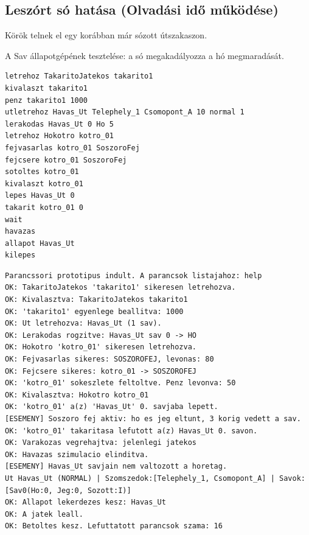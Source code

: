 \subsection{Leszórt só hatása (Olvadási idő működése)}
\begin{test-case-description}
    Körök telnek el egy korábban már sózott útszakaszon.
\end{test-case-description}
\begin{test-case-function}
    A Sav állapotgépének tesztelése: a só megakadályozza a hó megmaradását.
\end{test-case-function}
\begin{test-case-input}
\begin{verbatim}
letrehoz TakaritoJatekos takarito1
kivalaszt takarito1
penz takarito1 1000
utletrehoz Havas_Ut Telephely_1 Csomopont_A 10 normal 1
lerakodas Havas_Ut 0 Ho 5
letrehoz Hokotro kotro_01
fejvasarlas kotro_01 SoszoroFej
fejcsere kotro_01 SoszoroFej
sotoltes kotro_01
kivalaszt kotro_01
lepes Havas_Ut 0
takarit kotro_01 0
wait
havazas
allapot Havas_Ut
kilepes
\end{verbatim}
\end{test-case-input}
\begin{test-case-output}
\begin{verbatim}
Parancssori prototipus indult. A parancsok listajahoz: help
OK: TakaritoJatekos 'takarito1' sikeresen letrehozva.
OK: Kivalasztva: TakaritoJatekos takarito1
OK: 'takarito1' egyenlege beallitva: 1000
OK: Ut letrehozva: Havas_Ut (1 sav).
OK: Lerakodas rogzitve: Havas_Ut sav 0 -> HO
OK: Hokotro 'kotro_01' sikeresen letrehozva.
OK: Fejvasarlas sikeres: SOSZOROFEJ, levonas: 80
OK: Fejcsere sikeres: kotro_01 -> SOSZOROFEJ
OK: 'kotro_01' sokeszlete feltoltve. Penz levonva: 50
OK: Kivalasztva: Hokotro kotro_01
OK: 'kotro_01' a(z) 'Havas_Ut' 0. savjaba lepett.
[ESEMENY] Soszoro fej aktiv: ho es jeg eltunt, 3 korig vedett a sav.
OK: 'kotro_01' takaritasa lefutott a(z) Havas_Ut 0. savon.
OK: Varakozas vegrehajtva: jelenlegi jatekos
OK: Havazas szimulacio elinditva.
[ESEMENY] Havas_Ut savjain nem valtozott a horetag.
Ut Havas_Ut (NORMAL) | Szomszedok:[Telephely_1, Csomopont_A] | Savok: [Sav0(Ho:0, Jeg:0, Sozott:I)]
OK: Allapot lekerdezes kesz: Havas_Ut
OK: A jatek leall.
OK: Betoltes kesz. Lefuttatott parancsok szama: 16
\end{verbatim}
\end{test-case-output}

